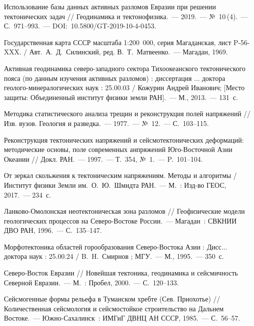 \begin{thebibliography}{99}
\bibitem{} Использование базы данных активных разломов Евразии при решении тектонических задач // Геодинамика и тектонофизика.~--- 2019.~--- №~10\,(4).~--- С.~971--993.~--- DOI:~10.5800/GT-2019-10-4-0453.

\bibitem{}Государственная карта СССР масштаба 1:200 000, серия Магаданская, лист P-56-XXX. / Авт.~А.~Д.~Силинский, ред. В.~Т.~Матвеенко.~--- Магадан, 1969.

\bibitem{} Активная геодинамика северо-западного сектора Тихоокеанского тектонического пояса (по данным изучения активных разломов) : диссертация ... доктора геолого-минералогических наук : 25.00.03 / Кожурин Андрей Иванович; [Место защиты: Объединенный институт физики земли РАН].~--- М., 2013.~--- 131~с.

\bibitem{} Методика статистического анализа трещин и реконструкция полей напряжений // Изв. вузов. Геология и разведка.~--- 1977.~--- №~12.~--- С.~103--115.

\bibitem{} Реконструкция тектонических напряжений и сейсмотектонических деформаций: методические основы, поле современных анпряжений Юго-Восточной Азии Океании // Докл. РАН.~--- 1997.~--- Т.~354, №~1.~--- P.~101--104.

\bibitem{} От зеркал скольжения к тектоническим напряжениям. Методы и алгоритмы / Институт физики Земли им.~О.~Ю.~Шмидта РАН.~--- М.~: Изд-во ГЕОС, 2017.~--- 234~с.

\bibitem{} Ланково-Омолонская неотектоническая зона разломов // Геофизические модели геологических процессов на Северо-Востоке России.~--- Магадан~: СВКНИИ ДВО РАН, 1996.~--- С.~135--147.

\bibitem{} Морфотектоника областей горообразования Северо-Востока Азии : Дисс... доктора наук : 25.00.24 / B.~H.~Смирнов ; МГУ.~--- М., 1995.~--- 350~с.

\bibitem{} Северо-Восток Евразии // Новейшая тектоника, геодинамика и сейсмичность Северной Евразии.~--- М.~: Пробел, 2000.~--- С.~120--133.

\bibitem{} Сейсмогенные формы рельефа в Туманском хребте (Сев. Приохотье) // Количественная сейсмология  и  сейсмостойкое  строительство  на  Дальнем  Востоке.~--- Южно-Сахалинск~: ИМГиГ ДВНЦ АН СССР, 1985.~--- С.~56--57.
\end{thebibliography}
